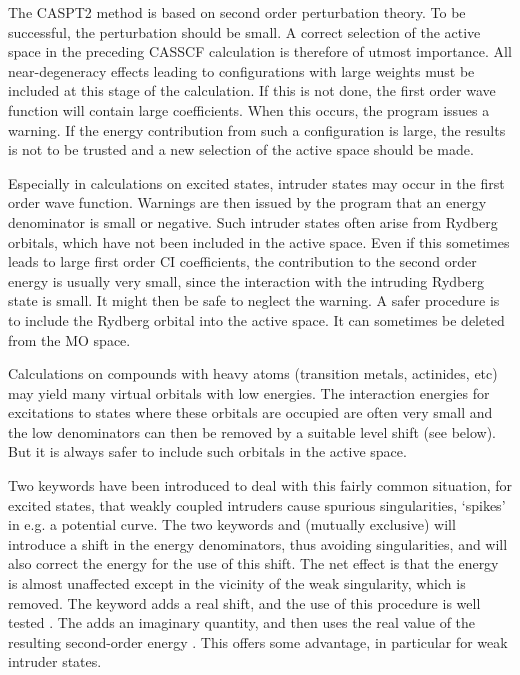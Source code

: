 The CASPT2 method is based on second order perturbation theory. To be
successful, the perturbation should be small. A correct selection of
the active space in the preceding CASSCF calculation is therefore of
utmost importance. All near-degeneracy effects leading to configurations
with large weights must be included at this stage of the calculation.
If this is not done, the first order wave function will contain large
coefficients. When this occurs, the  program issues a warning.
If the energy contribution from such a configuration is large, the results is
not to be trusted and a new selection of the active space should be made.

Especially in calculations on excited states, intruder states may occur in the
first  order wave function. Warnings are then issued by
the program that an energy denominator is small or negative. Such intruder
states often arise from Rydberg orbitals, which have not been included in the
active space. Even if this sometimes leads to large first order CI coefficients,
the contribution to the second order energy is usually very small, since the
interaction with the intruding Rydberg state is small. It might then be
safe to neglect the warning. A safer procedure is to include the Rydberg
orbital into the active space. It can sometimes be deleted from the MO space.

Calculations on compounds with heavy atoms (transition metals, actinides, etc)
may yield many virtual orbitals with low energies. The interaction energies for
excitations to states where these orbitals are occupied are often very small and
the low denominators can then be removed by a suitable level shift (see below).
But it is always safer to include such orbitals in the active space.

Two keywords have been introduced to deal with this fairly common
situation, for excited states, that weakly coupled intruders cause
spurious singularities, `spikes' in e.g. a potential curve. The two
keywords  and  (mutually exclusive) will introduce a shift
in the  energy denominators,
thus avoiding singularities, and will also correct the energy for the use of
this shift. The net effect is that the energy is almost unaffected except in
the vicinity of the weak singularity, which is removed. The  keyword adds
a real shift, and the use of this procedure is well tested
\cite{Roos:95b,Roos:96a}. The  adds an imaginary quantity, and
then uses the real value of the resulting second-order energy
\cite{Forsberg:96}. This offers some advantage, in particular for weak intruder
states.

